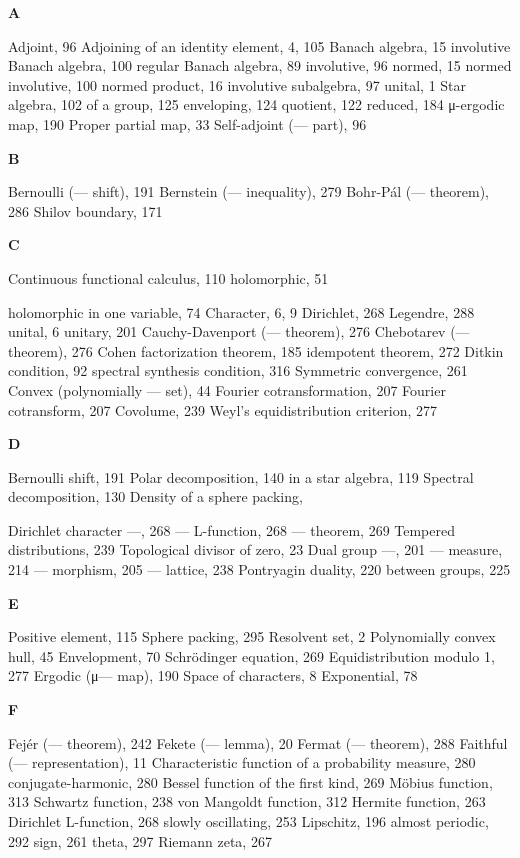 
\textbf{A}

Adjoint, 96 Adjoining of an identity element, 4, 105 Banach algebra, 15 involutive Banach algebra, 100 regular Banach algebra, 89 involutive, 96 normed, 15 normed involutive, 100 normed product, 16 involutive subalgebra, 97 unital, 1 Star algebra, 102 of a group, 125 enveloping, 124 quotient, 122 reduced, 184 μ-ergodic map, 190 Proper partial map, 33 Self-adjoint (--- part), 96

\textbf{B}

Bernoulli (--- shift), 191 Bernstein (--- inequality), 279 Bohr-Pál (--- theorem), 286 Shilov boundary, 171

\textbf{C}

Continuous functional calculus, 110 holomorphic, 51

holomorphic in one variable, 74 Character, 6, 9 Dirichlet, 268 Legendre, 288 unital, 6 unitary, 201 Cauchy-Davenport (--- theorem), 276 Chebotarev (--- theorem), 276 Cohen factorization theorem, 185 idempotent theorem, 272 Ditkin condition, 92 spectral synthesis condition, 316 Symmetric convergence, 261 Convex (polynomially --- set), 44 Fourier cotransformation, 207 Fourier cotransform, 207 Covolume, 239 Weyl's equidistribution criterion, 277

\textbf{D}

Bernoulli shift, 191 Polar decomposition, 140 in a star algebra, 119 Spectral decomposition, 130 Density of a sphere packing,

Dirichlet character ---, 268 --- L-function, 268 --- theorem, 269 Tempered distributions, 239 Topological divisor of zero, 23 Dual group ---, 201 --- measure, 214 --- morphism, 205 --- lattice, 238 Pontryagin duality, 220 between groups, 225

\textbf{E}

Positive element, 115 Sphere packing, 295 Resolvent set, 2 Polynomially convex hull, 45 Envelopment, 70 Schrödinger equation, 269 Equidistribution modulo 1, 277 Ergodic (μ--- map), 190 Space of characters, 8 Exponential, 78

\textbf{F}

Fejér (--- theorem), 242 Fekete (--- lemma), 20 Fermat (--- theorem), 288 Faithful (--- representation), 11 Characteristic function of a probability measure, 280 conjugate-harmonic, 280 Bessel function of the first kind, 269 Möbius function, 313 Schwartz function, 238 von Mangoldt function, 312 Hermite function, 263 Dirichlet L-function, 268 slowly oscillating, 253 Lipschitz, 196 almost periodic, 292 sign, 261 theta, 297 Riemann zeta, 267

